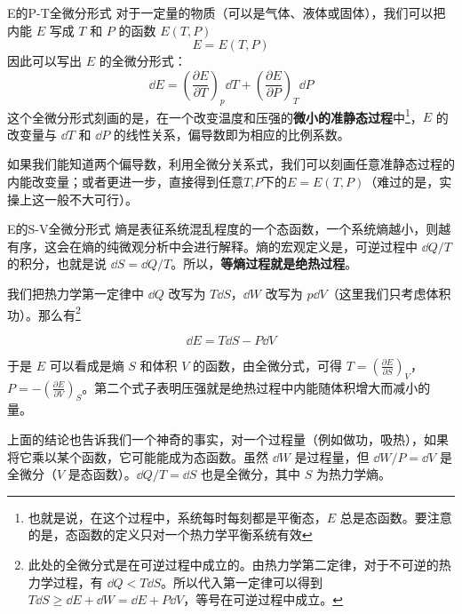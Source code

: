 \begin{example}{E的P-T全微分形式}
对于一定量的物质（可以是气体、液体或固体），我们可以把内能 $E$ 写成 $T$ 和 $P$ 的函数 $E(T,P)$
\begin{equation}
E=E(T,P)
\end{equation}
因此可以写出 $E$ 的全微分形式：
\begin{equation}
\dd E=\left(\frac{\partial E}{\partial T}\right)_p \dd T + \left(\frac{\partial E}{\partial P}\right)_T \dd P
\end{equation}
这个全微分形式刻画的是，在一个改变温度和压强的\textbf{微小的准静态过程}中\footnote{也就是说，在这个过程中，系统每时每刻都是平衡态，$E$ 总是态函数。要注意的是，态函数的定义只对一个热力学平衡系统有效}，$E$ 的改变量与 $\dd T$ 和 $\dd P$ 的线性关系，偏导数即为相应的比例系数。

如果我们能知道两个偏导数，利用全微分关系式，我们可以刻画任意准静态过程的内能改变量；或者更进一步，直接得到任意$T$,$P$下的$E=E(T,P)$（难过的是，实操上这一般不大可行）。
\end{example}

\begin{example}{E的S-V全微分形式}
熵是表征系统混乱程度的一个态函数，一个系统熵越小，则越有序，这会在熵的纯微观分析中会进行解释。熵的宏观定义是，可逆过程中 $\dd Q/T$ 的积分，也就是说 $\dd S=\dd Q/T$。所以，\textbf{等熵过程就是绝热过程}。

我们把热力学第一定律中 $\dd Q$ 改写为 $T\dd S$，$\dd W$ 改写为 $p\dd V$（这里我们只考虑体积功）。那么有\footnote{
此处的全微分式是在可逆过程中成立的。由热力学第二定律，对于不可逆的热力学过程，有 $\dd Q<T\dd S$。所以代入第一定律可以得到 $T\dd S\ge \dd E+\dd W=\dd E+P\dd V$，等号在可逆过程中成立。
}

\begin{equation}
\dd E=T\dd S-P\dd V
\end{equation}

于是 $E$ 可以看成是熵 $S$ 和体积 $V$ 的函数，由全微分式，可得 $T=\left(\frac{\partial E}{\partial S}\right)_V$，$P=-\left(\frac{\partial E}{\partial V}\right)_S$。第二个式子表明压强就是绝热过程中内能随体积增大而减小的量。

上面的结论也告诉我们一个神奇的事实，对一个过程量（例如做功，吸热），如果将它乘以某个函数，它可能能成为态函数。虽然 $\dd W$ 是过程量，但 $\dd W/P=\dd V$ 是全微分（$V$ 是态函数）。$\dd Q/T=\dd S$ 也是全微分，其中 $S$ 为热力学熵。
\end{example}

